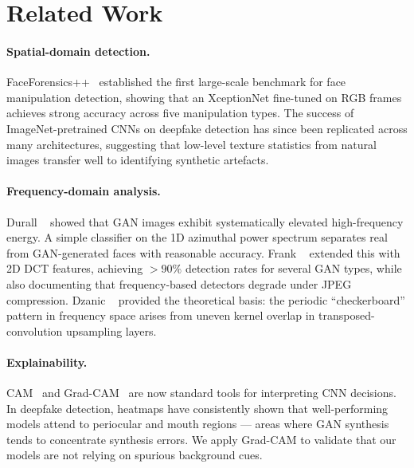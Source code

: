 \section{Related Work}
\label{sec:related}

\paragraph{Spatial-domain detection.}
FaceForensics++~\cite{rossler2019faceforensics} established the first
large-scale benchmark for face manipulation detection, showing that an
XceptionNet fine-tuned on RGB frames achieves strong accuracy across five
manipulation types.
The success of ImageNet-pretrained CNNs on deepfake detection has since been
replicated across many architectures, suggesting that low-level texture
statistics from natural images transfer well to identifying synthetic
artefacts.

\paragraph{Frequency-domain analysis.}
Durall \etal~\cite{durall2019unmasking} showed that GAN images exhibit
systematically elevated high-frequency energy.
A simple classifier on the 1D azimuthal power spectrum separates real from
GAN-generated faces with reasonable accuracy.
Frank \etal~\cite{frank2020frequency} extended this with 2D DCT features,
achieving $>90\%$ detection rates for several GAN types, while also
documenting that frequency-based detectors degrade under JPEG compression.
Dzanic \etal~\cite{dzanic2020fourier} provided the theoretical basis:
the periodic ``checkerboard'' pattern in frequency space arises from uneven
kernel overlap in transposed-convolution upsampling layers.

\paragraph{Explainability.}
CAM~\cite{zhou2016cam} and Grad-CAM~\cite{selvaraju2017gradcam} are now
standard tools for interpreting CNN decisions.
In deepfake detection, heatmaps have consistently shown that
well-performing models attend to periocular and mouth regions — areas where
GAN synthesis tends to concentrate synthesis errors.
We apply Grad-CAM to validate that our models are not relying on spurious
background cues.

